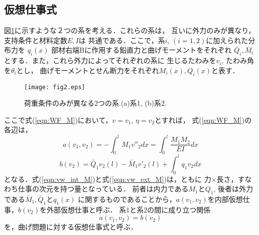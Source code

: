 \documentclass[10pt,a4j]{jarticle}
\begin{document}
\subsection{仮想仕事式}
図\ref{fig:fig2_2}に示すような２つの系を考える．これらの系は，
互いに外力のみが異なり，支持条件と材料定数$E,I$は
共通である．ここで，系$i,\, (i=1,2)$に加えられた分布力を
$q_i(x)$ 部材右端Bに作用する鉛直力と曲げモーメントをそれぞれ
$\bar Q_i, \bar M_i$とする．また，これら外力によってそれぞれの系に
生じるたわみを$v_i$, たわみ角を$\theta_i$とし，
曲げモーメントとせん断力をそれぞれ$M_i(x), Q_i(x)$と表す．
\begin{figure}[h]
	\begin{center}
	\texttt{[image: fig2.eps]} 
	\end{center}
	\caption{荷重条件のみが異なる2つの系.(a)系1, (b)系2.} 
	\label{fig:fig2_2}
\end{figure}
ここで式(\ref{eqn:WF_M})において，$v=v_1$, $\eta=v_2$とすれば，
式(\ref{eqn:WF_M})の各辺は，
\begin{equation}
	a(v_1,v_2)=-\int_0^l M_1v''_2dx = \int_0^l\frac{M_1M_2}{EI}dx
	\label{eqn:vw_int_M}
\end{equation}
\begin{equation}
	b(v_2)=\bar Q_1 v_2(l)-\bar M_1  v'_2(l) +\int_0^l q_1 v_2dx
	\label{eqn:vw_ext_M}
\end{equation}
となる．式(\ref{eqn:vw_int_M})と式(\ref{eqn:vw_ext_M})は，ともに
力$\times$長さ，すなわち仕事の次元を持つ量となっている．
前者は内力である$M_1$と$Q_1$, 後者は外力である$\bar M_1, \bar Q_1$と$q_1(x)$
に関するものであることから，$a(v_1,v_2)$を内部仮想仕事，$b(v_2)$を外部仮想仕事と呼ぶ．
系1と系2の間に成り立つ関係
\begin{equation}
	a(v_1,v_2)=b(v_2)
	\label{eqn:vw_eq_M}
\end{equation}
を，曲げ問題に対する仮想仕事式と呼ぶ．
\end{document}

